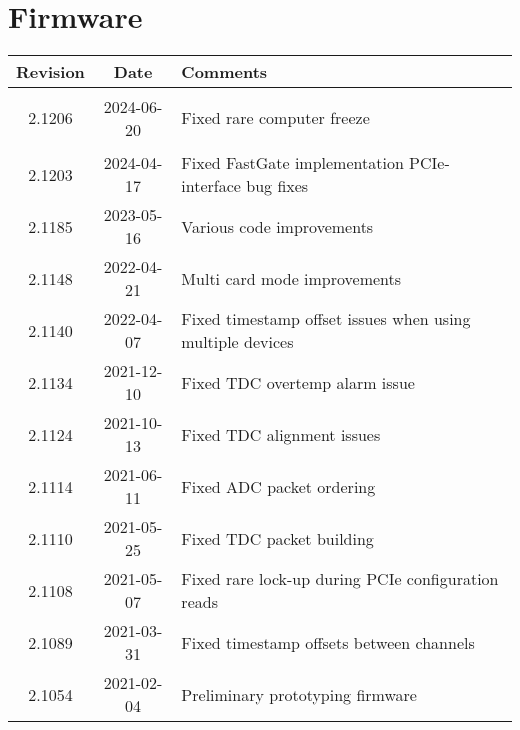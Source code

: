 \section{Firmware} \label{sec:firmware}
\begin{tabularx}{\textwidth}{|c|c|X|}
    \hline
    Revision & Date & Comments\\
    \hline\hline
	\hypertarget{fwrev}{2.1206} & 2024-06-20 & Fixed rare computer freeze\\
	\hline
	2.1203 & 2024-04-17 &
		Fixed FastGate implementation\newline
		PCIe-interface bug fixes
	\\
	\hline
	2.1185 & 2023-05-16 & Various code improvements\\
	\hline
	2.1148 & 2022-04-21 & Multi card mode improvements\\
	\hline
	2.1140 & 2022-04-07 & Fixed timestamp offset issues when using multiple devices\\
	\hline
	2.1134 & 2021-12-10 & Fixed TDC overtemp alarm issue\\
	\hline
	2.1124 & 2021-10-13 & Fixed TDC alignment issues\\
	\hline
	2.1114 & 2021-06-11 & Fixed ADC packet ordering\\
	\hline
	2.1110 & 2021-05-25 & Fixed TDC packet building\\
	\hline
	2.1108 & 2021-05-07 & Fixed rare lock-up during PCIe configuration reads\\
	\hline
	2.1089 & 2021-03-31 & Fixed timestamp offsets between channels\\
	\hline
    2.1054 & 2021-02-04 & Preliminary prototyping firmware\\
    \hline
\end{tabularx}
